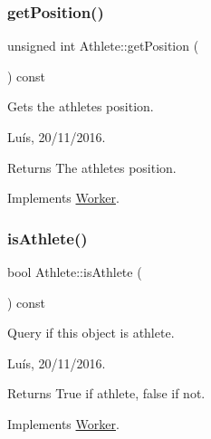 \hypertarget{class_athlete_a18ca289d50900c3825f21d36f2bf8d75}{}\label{class_athlete_a18ca289d50900c3825f21d36f2bf8d75} 
\subsubsection{\texorpdfstring{get\+Position()}{getPosition()}}
{\footnotesize\ttfamily unsigned int Athlete\+::get\+Position (\begin{DoxyParamCaption}{ }\end{DoxyParamCaption}) const\hspace{0.3cm}{\ttfamily [virtual]}}



Gets the athlete\textquotesingle{}s position. 

Luís, 20/11/2016. 

\begin{DoxyReturn}{Returns}
The athlete\textquotesingle{}s position. 
\end{DoxyReturn}


Implements \hyperlink{class_worker_a5fd37dea8c5e6579c1deecbfc1b22db9}{Worker}.

\hypertarget{class_athlete_a5a6f1744e0944cbabbe333964d6357f4}{}\label{class_athlete_a5a6f1744e0944cbabbe333964d6357f4} 
\subsubsection{\texorpdfstring{is\+Athlete()}{isAthlete()}}
{\footnotesize\ttfamily bool Athlete\+::is\+Athlete (\begin{DoxyParamCaption}{ }\end{DoxyParamCaption}) const\hspace{0.3cm}{\ttfamily [virtual]}}



Query if this object is athlete. 

Luís, 20/11/2016. 

\begin{DoxyReturn}{Returns}
True if athlete, false if not. 
\end{DoxyReturn}


Implements \hyperlink{class_worker_a0a2eb7505b3a734184be3dfdf3316cc3}{Worker}.

\hypertarget{class_athlete_a73fdec76546be945f02cc2b6d90b99ca}{}\label{class_athlete_a73fdec76546be945f02cc2b6d90b99ca} 
